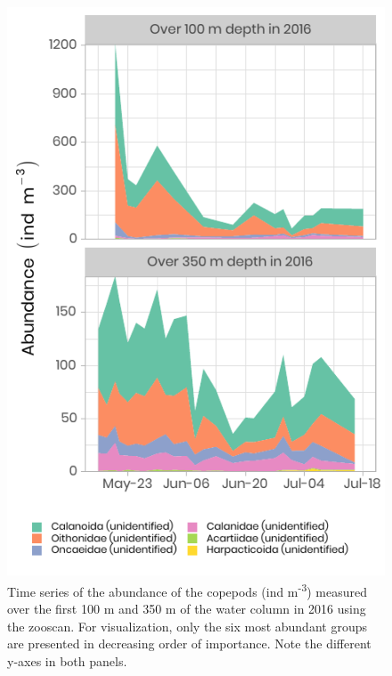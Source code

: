 \documentclass[12pt,a4paper]{scrartcl}
\begin{document}
\clearpage
\newpage

\begin{figure}[h]
	\centering
	\includegraphics[scale = 1]{../../../graphs/fig14.pdf}
	\caption{Time series of the abundance of the copepods (ind m\textsuperscript{-3}) measured over the first 100 m and 350 m of the water column in 2016 using the zooscan. For visualization, only the six most abundant groups are presented in decreasing order of importance. Note the different y-axes in both panels.}
\end{figure}
\end{document}
